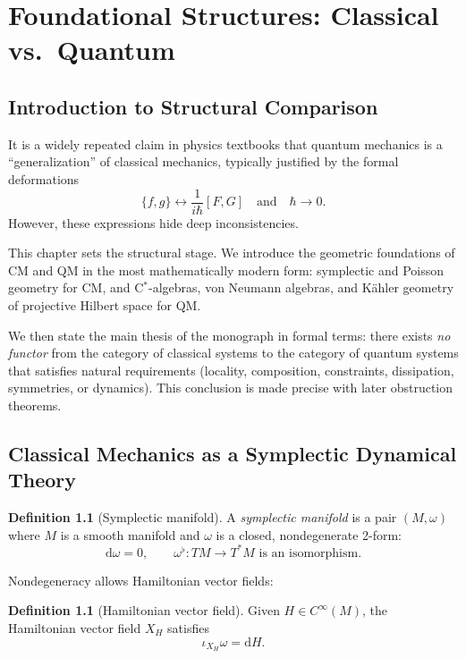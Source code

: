 \documentclass[12pt,oneside]{book}
\theoremstyle{plain}
\theoremstyle{definition}
\newtheorem{definition}[theorem]{Definition}
\begin{document}
\mainmatter

\chapter{Foundational Structures: Classical vs.\ Quantum}

\section{Introduction to Structural Comparison}

It is a widely repeated claim in physics textbooks that quantum mechanics
is a ``generalization'' of classical mechanics,
typically justified by the formal deformations
\[
\{f,g\} \longleftrightarrow \frac{1}{i\hbar}[F,G]
\quad\text{and}\quad
\hbar \to 0.
\]
However, these expressions hide deep inconsistencies.

This chapter sets the structural stage.
We introduce the geometric foundations of CM and QM
in the most mathematically modern form:
symplectic and Poisson geometry for CM,
and C$^\ast$-algebras, von Neumann algebras, and Kähler geometry of projective Hilbert space for QM.

We then state the main thesis of the monograph in formal terms:
there exists \emph{no functor} from the category of classical systems to the category of quantum systems
that satisfies natural requirements (locality, composition, constraints, dissipation, symmetries, or dynamics).
This conclusion is made precise with later obstruction theorems.

\section{Classical Mechanics as a Symplectic Dynamical Theory}

\begin{definition}[Symplectic manifold]
A \emph{symplectic manifold} is a pair $(M,\omega)$
where $M$ is a smooth manifold and $\omega$ is a closed, nondegenerate 2-form:
\[
\mathrm{d}\omega = 0,\qquad
\omega^\flat : TM \to T^\ast M \text{ is an isomorphism}.
\]
\end{definition}

Nondegeneracy allows Hamiltonian vector fields:

\begin{definition}[Hamiltonian vector field]
Given $H\in C^\infty(M)$, the Hamiltonian vector field $X_H$ satisfies
\[
\iota_{X_H}\omega = \mathrm{d}H.
\]
\end{definition}
\end{document}
